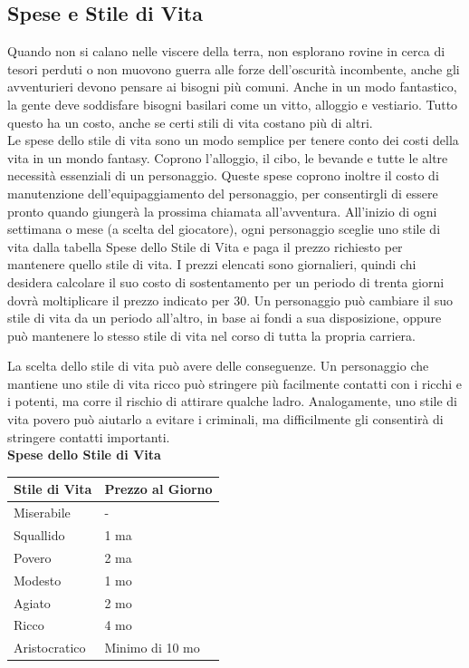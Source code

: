\documentclass[a4paper,twoside,openany]{book}
\begin{document}
\begin{multicols}{2}
\end{multicols}

\pagebreak

\subsection{Spese e Stile di Vita}

\begin{multicols}{2}

Quando non si calano nelle viscere della terra, non esplorano rovine in cerca di tesori perduti o non muovono guerra alle forze dell'oscurità incombente, anche gli avventurieri devono pensare ai bisogni più comuni. Anche in un modo fantastico, la gente deve soddisfare bisogni basilari come un vitto, alloggio e vestiario. Tutto questo ha un costo, anche se certi stili di vita costano più di altri.\\

Le spese dello stile di vita sono un modo semplice per tenere conto dei costi della vita in un mondo fantasy. Coprono l'alloggio, il cibo, le bevande e tutte le altre necessità essenziali di un personaggio. Queste spese coprono inoltre il costo di manutenzione dell'equipaggiamento del personaggio, per consentirgli di essere pronto quando giungerà la prossima chiamata all'avventura. All'inizio di ogni settimana o mese (a scelta del giocatore), ogni personaggio sceglie uno stile di vita dalla tabella Spese dello Stile di Vita e paga il prezzo richiesto per mantenere quello stile di vita. I prezzi elencati sono giornalieri, quindi chi desidera calcolare il suo costo di sostentamento per un periodo di trenta giorni dovrà moltiplicare il prezzo indicato per 30. Un personaggio può cambiare il suo stile di vita da un periodo all'altro, in base ai fondi a sua disposizione, oppure può mantenere lo stesso stile di vita nel corso di tutta la propria carriera.

La scelta dello stile di vita può avere delle conseguenze. Un personaggio che mantiene uno stile di vita ricco può stringere più facilmente contatti con i ricchi e i potenti, ma corre il rischio di attirare qualche ladro. Analogamente, uno stile di vita povero può aiutarlo a evitare i criminali, ma difficilmente gli consentirà di stringere contatti importanti.\\


\textbf{Spese dello Stile di Vita}

\medskip

\begin{tabular}{ll}
\textbf{Stile di Vita}&\textbf{Prezzo al Giorno}\\
\toprule
Miserabile&-\\
Squallido&1 ma\\
Povero&2 ma\\
Modesto&1 mo\\
Agiato&2 mo\\
Ricco&4 mo\\
Aristocratico&Minimo di 10 mo\\
\end{tabular}\\



\end{multicols}
\end{document}
